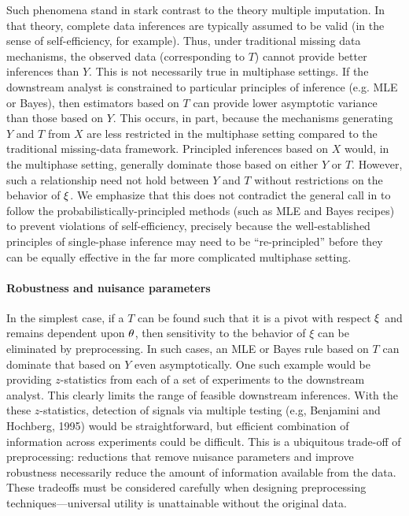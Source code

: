 Such phenomena stand in stark contrast to the theory multiple imputation.
In that theory, complete data inferences are typically assumed to be valid (in the sense of self-efficiency, for example).
Thus, under traditional missing data mechanisms, the observed data (corresponding to $T$) cannot provide better inferences than $Y$.
This is not necessarily true in multiphase settings.
If the downstream analyst is constrained to particular principles of inference (e.g. MLE or Bayes), then estimators based on $T$ can provide lower asymptotic variance than those based on $Y$.
This occurs, in part, because the mechanisms generating $Y$ and $T$ from $X$ are less restricted in the multiphase setting compared to the traditional missing-data framework.
Principled inferences based on $X$ would, in the multiphase setting, generally dominate those based on either $Y$ or $T$.
However, such a relationship need not hold between $Y$ and $T$ without restrictions on the behavior of $\xi$.
We emphasize that this does not contradict the general call in \citet{Meng2012} to follow the probabilistically-principled methods (such as MLE and Bayes recipes) to prevent violations of self-efficiency, precisely because the well-established principles of single-phase inference may need to be ``re-principled'' before they can be equally effective in the far more complicated multiphase setting.   

\paragraph{Robustness and nuisance parameters}
In the simplest case, if a $T$ can be found such that it is a pivot with respect $\xi$ and remains dependent upon $\theta$, then sensitivity to the behavior of $\xi$ can be eliminated by preprocessing.
In such cases, an MLE or Bayes rule based on $T$ can dominate that based on $Y$ even asymptotically.
One such example would be providing $z$-statistics from each of a set of experiments to the downstream analyst.
This clearly limits the range of feasible downstream inferences.
With the these $z$-statistics, detection of signals via multiple testing (e.g, Benjamini and Hochberg, 1995) would be straightforward, but efficient combination of information across experiments could be difficult.
This is a ubiquitous trade-off of preprocessing: reductions that remove nuisance parameters and improve robustness necessarily reduce the amount of information available from the data.
These tradeoffs must be considered carefully when designing preprocessing techniques---universal utility is unattainable without  the original data.


